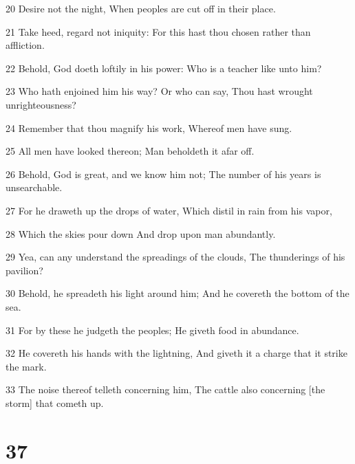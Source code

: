 \par 20 Desire not the night, When peoples are cut off in their place.
\par 21 Take heed, regard not iniquity: For this hast thou chosen rather than affliction.
\par 22 Behold, God doeth loftily in his power: Who is a teacher like unto him?
\par 23 Who hath enjoined him his way? Or who can say, Thou hast wrought unrighteousness?
\par 24 Remember that thou magnify his work, Whereof men have sung.
\par 25 All men have looked thereon; Man beholdeth it afar off.
\par 26 Behold, God is great, and we know him not; The number of his years is unsearchable.
\par 27 For he draweth up the drops of water, Which distil in rain from his vapor,
\par 28 Which the skies pour down And drop upon man abundantly.
\par 29 Yea, can any understand the spreadings of the clouds, The thunderings of his pavilion?
\par 30 Behold, he spreadeth his light around him; And he covereth the bottom of the sea.
\par 31 For by these he judgeth the peoples; He giveth food in abundance.
\par 32 He covereth his hands with the lightning, And giveth it a charge that it strike the mark.
\par 33 The noise thereof telleth concerning him, The cattle also concerning [the storm] that cometh up.

\chapter{37}

